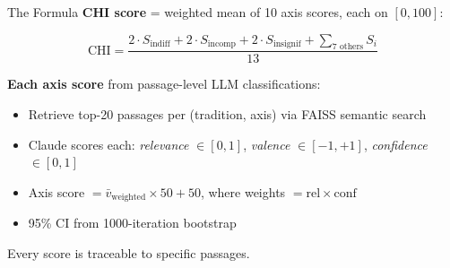 \documentclass[10pt, aspectratio=169]{beamer}
\begin{document}
\begin{frame}{The Formula}
  \vspace{0.5em}
  \textbf{CHI score} = weighted mean of 10 axis scores, each on $[0, 100]$:

  \vspace{0.8em}
  \[
    \mathrm{CHI} = \frac{2 \cdot S_\text{indiff} + 2 \cdot S_\text{incomp} + 2 \cdot S_\text{insignif}
                        + \sum_{\text{7 others}} S_i}{13}
  \]

  \vspace{0.8em}
  \textbf{Each axis score} from passage-level LLM classifications:
  \begin{itemize}
    \item Retrieve top-20 passages per (tradition, axis) via FAISS semantic search
    \item Claude scores each: \textit{relevance} $\in[0,1]$, \textit{valence} $\in[-1,+1]$, \textit{confidence} $\in[0,1]$
    \item Axis score $= \bar{v}_\text{weighted} \times 50 + 50$, where weights $= \text{rel} \times \text{conf}$
    \item 95\% CI from 1000-iteration bootstrap
  \end{itemize}

  \vspace{0.5em}
  \alert{Every score is traceable to specific passages.}
\end{frame}
\end{document}
